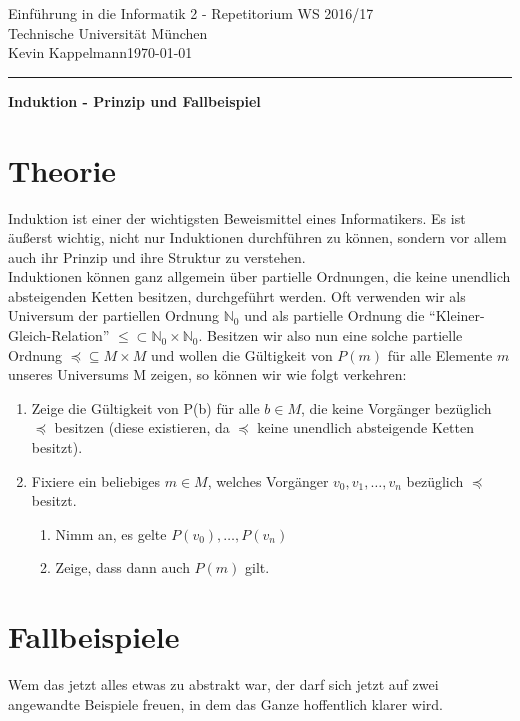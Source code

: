 \documentclass[hidelinks]{article}
\theoremstyle{plain}
\theoremstyle{definition}
\theoremstyle{rem}
\begin{document}

\begin{sloppypar}
\begingroup  
  \LARGE Einführung in die Informatik 2 - Repetitorium WS 2016/17\\Technische Universität München\\[0.5em]
  \large{Kevin Kappelmann\hfill \today}\\
\endgroup
\hrule height 1pt
{\LARGE{{\begin{center}\textbf{Induktion - Prinzip und Fallbeispiel}\end{center}}}}
\section{Theorie}
Induktion ist einer der wichtigsten Beweismittel eines Informatikers. Es ist äußerst wichtig, nicht nur Induktionen durchführen zu können, sondern vor allem auch ihr Prinzip und ihre Struktur zu verstehen.\\
Induktionen können ganz allgemein über partielle Ordnungen, die keine unendlich absteigenden Ketten besitzen, durchgeführt werden. Oft verwenden wir als Universum der partiellen Ordnung $\mathbb{N}_0$ und als partielle Ordnung die ``Kleiner-Gleich-Relation'' $\le\subset\mathbb{N}_0\times\mathbb{N}_0$. Besitzen wir also nun eine solche partielle Ordnung $\preceq\subseteq M\times M$ und wollen die Gültigkeit von $P(m)$ für alle Elemente $m$ unseres Universums M zeigen, so können wir wie folgt verkehren:
\begin{enumerate}
\item Zeige die Gültigkeit von P(b) für alle $b\in M$, die keine Vorgänger bezüglich $\preceq$ besitzen (diese existieren, da $\preceq$ keine unendlich absteigende Ketten besitzt).
\item Fixiere ein beliebiges $m\in M$, welches Vorgänger $v_0,v_1,\ldots,v_n$ bezüglich $\preceq$ besitzt.
\begin{enumerate}
\item Nimm an, es gelte $P(v_0),\ldots,P(v_n)$
\item Zeige, dass dann auch $P(m)$ gilt.
\end{enumerate}
\end{enumerate}
\section{Fallbeispiele}
Wem das jetzt alles etwas zu abstrakt war, der darf sich jetzt auf zwei angewandte Beispiele freuen, in dem das Ganze hoffentlich klarer wird.

\end{sloppypar}
\end{document}
